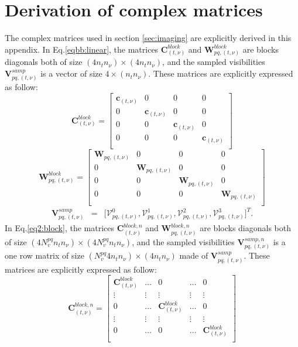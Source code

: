 \documentclass[useAMS,usenatbib]{mn2e}
\begin{document}
\section[]{Derivation of complex matrices}
The complex matrices used in section \ref{sec:imaging} are explicitly derived in this appendix. In Eq.\ref{eqbb:linear}, the matrices
$\mathbf{C}_{(t,\nu)}^{block}$ and $\mathbf{W}_{pq,(t,\nu)}^{block}$ are blocks diagonals  both of size $(4n_t n_{\nu})\times(4n_t 
n_{\nu})$, and  the sampled visibilities $\mathbf{V}_{pq,(t,\nu)}^{samp}$ is a vector of size $4\times (n_t n_{\nu})$. These matrices are 
explicitly expressed as follow:
\begin{equation*}
\mathbf{C}_{(t,\nu)}^{block}=
  \begin{bmatrix}
    \mathbf{c}_{(t,\nu)} & 0 & 0 & 0\\
    0 &  \mathbf{c}_{(t,\nu)} &0 & 0 \\
    0 & 0 & \mathbf{c}_{(t,\nu)} & 0\\
      0 & 0 & 0 & \mathbf{c}_{(t,\nu)}\\
  \end{bmatrix}
\end{equation*}
\begin{equation*}
\mathbf{W}_{pq,(t,\nu)}^{block}=
  \begin{bmatrix}
    \mathbf{W}_{pq,(t,\nu)}& 0 & 0 & 0\\
    0 &  \mathbf{W}_{pq,(t,\nu)} &0 & 0 \\
    0 & 0 & \mathbf{W}_{pq,(t,\nu)} & 0\\
      0 & 0 & 0 & \mathbf{W}_{pq,(t,\nu)}\\
  \end{bmatrix}
\end{equation*}
\begin{eqnarray*}
\mathbf{V}_{pq,(t,\nu)}^{samp}&=&\Bigg[\mathcal{V}_{pq,(t,\nu)}^{0},\mathcal{ V } 
^1_{pq,(t,\nu)},\mathcal{V}^2_{pq,(t,\nu)},\mathcal{V}_{pq,(t,\nu)}^{3 } \Bigg]^T. 
\end{eqnarray*}
In Eq.\ref{eq2:block}, the matrices $\mathbf{C}_{(t,\nu)}^{block,n}$ and 
$\mathbf{W}_{pq,(t,\nu)}^{block,n}$ are blocks diagonals both of size $(4N_v^{pq}n_t n_{\nu})\times (4N_v^{pq}n_t n_{\nu})$, and 
the sampled visibilities $\mathbf{V}_{pq,(t,\nu)}^{samp,n}$ is a one row matrix of size $(N_v^{pq}4 n_t n_{\nu})\times (4 n_t n_{\nu})$ 
made of $\textbf{V}_{pq,(t,\nu)}^{samp}$. These matrices are explicitly expressed as follow:
\begin{equation*}
\mathbf{C}_{(t,\nu)}^{block,n}=
  \begin{bmatrix}
    \mathbf{C}_{(t,\nu)}^{block} &\dots & 0 & \dots & 0\\
    \vdots & \vdots & \vdots & \vdots & \vdots\\
    0 & \dots& \mathbf{C}_{(t,\nu)}^{block} &\dots & 0\\
    \vdots & \vdots & \vdots & \vdots & \vdots \\
    0 & \dots& 0 &\dots & \mathbf{C}_{(t,\nu)}^{block}\\
  \end{bmatrix}
\end{equation*}
\end{document}
